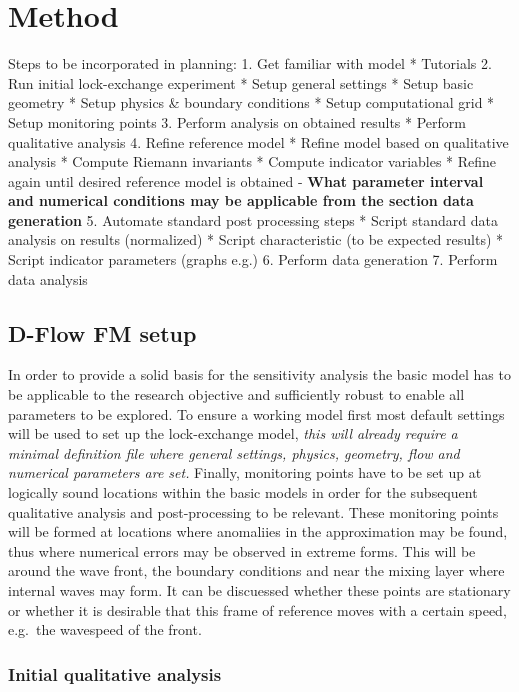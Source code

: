 \chapter{Method}\label{method}

Steps to be incorporated in planning: 1. Get familiar with model *
Tutorials 2. Run initial lock-exchange experiment * Setup general
settings * Setup basic geometry * Setup physics \& boundary conditions *
Setup computational grid * Setup monitoring points 3. Perform analysis
on obtained results * Perform qualitative analysis 4. Refine reference
model * Refine model based on qualitative analysis * Compute Riemann
invariants * Compute indicator variables * Refine again until desired
reference model is obtained - \textbf{What parameter interval and
numerical conditions may be applicable from the section data generation}
5. Automate standard post processing steps * Script standard data
analysis on results (normalized) * Script characteristic (to be expected
results) * Script indicator parameters (graphs e.g.) 6. Perform data
generation 7. Perform data analysis

\section{D-Flow FM setup}\label{d-flow-fm-setup}

In order to provide a solid basis for the sensitivity analysis the basic
model has to be applicable to the research objective and sufficiently
robust to enable all parameters to be explored. To ensure a working
model first most default settings will be used to set up the
lock-exchange model, \emph{this will already require a minimal
definition file where general settings, physics, geometry, flow and
numerical parameters are set.} Finally, monitoring points have to be set
up at logically sound locations within the basic models in order for the
subsequent qualitative analysis and post-processing to be relevant.
These monitoring points will be formed at locations where anomaliies in
the approximation may be found, thus where numerical errors may be
observed in extreme forms. This will be around the wave front, the
boundary conditions and near the mixing layer where internal waves may
form. It can be discuessed whether these points are stationary or
whether it is desirable that this frame of reference moves with a
certain speed, e.g.~the wavespeed of the front.

\subsection{Initial qualitative
analysis}\label{initial-qualitative-analysis}

